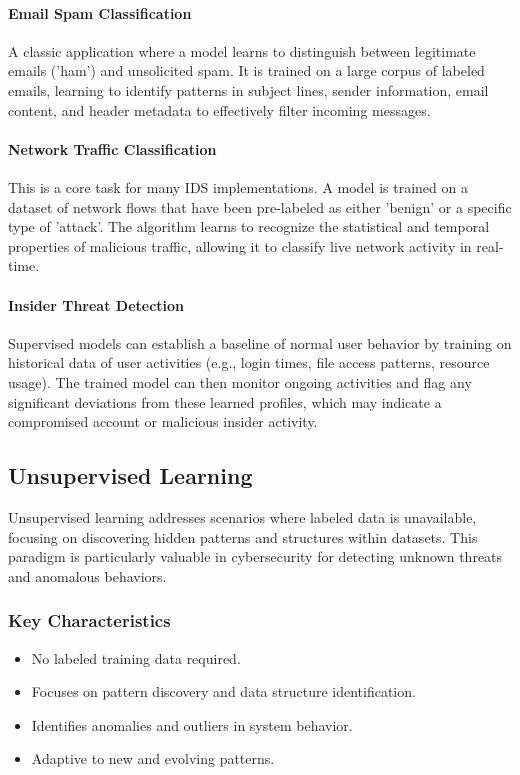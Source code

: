 \documentclass[12pt]{report}
\begin{document}
\paragraph{Email Spam Classification}
A classic application where a model learns to distinguish between legitimate emails ('ham') and unsolicited spam. It is trained on a large corpus of labeled emails, learning to identify patterns in subject lines, sender information, email content, and header metadata to effectively filter incoming messages.

\paragraph{Network Traffic Classification}
This is a core task for many IDS implementations. A model is trained on a dataset of network flows that have been pre-labeled as either 'benign' or a specific type of 'attack'. The algorithm learns to recognize the statistical and temporal properties of malicious traffic, allowing it to classify live network activity in real-time.

\paragraph{Insider Threat Detection}
Supervised models can establish a baseline of normal user behavior by training on historical data of user activities (e.g., login times, file access patterns, resource usage). The trained model can then monitor ongoing activities and flag any significant deviations from these learned profiles, which may indicate a compromised account or malicious insider activity.

\subsection{Unsupervised Learning}
Unsupervised learning addresses scenarios where labeled data is unavailable, focusing on discovering hidden patterns and structures within datasets. This paradigm is particularly valuable in cybersecurity for detecting unknown threats and anomalous behaviors.

\subsubsection{Key Characteristics}
\begin{itemize}
    \item No labeled training data required.
    \item Focuses on pattern discovery and data structure identification.
    \item Identifies anomalies and outliers in system behavior.
    \item Adaptive to new and evolving patterns.
\end{itemize}
\end{document}
